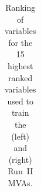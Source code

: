\begin{table}[h]
{\begin{tabular}{ c l c | c l c}
\hline
\end{tabular}
}
\caption{Ranking of variables for the 15 highest ranked variables used to train the \decay{\Dsp}{\Kp\Km\pip} (left) and \decay{\phiz}{\Kp\Km} (right) Run~II MVAs.}
\label{tab:mvarank_dsandphi}
\end{table}

